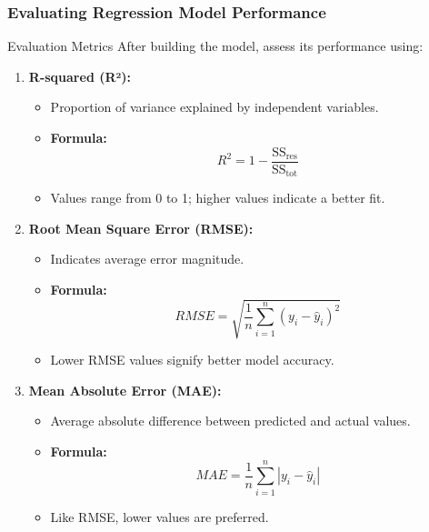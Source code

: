 \documentclass{beamer}
\begin{document}
\begin{frame}
    \frametitle{Evaluating Regression Model Performance}
    \begin{block}{Evaluation Metrics}
        After building the model, assess its performance using:
    \end{block}
    \begin{enumerate}
        \item \textbf{R-squared (R²):}
            \begin{itemize}
                \item Proportion of variance explained by independent variables.
                \item \textbf{Formula:} 
                \[
                R^2 = 1 - \frac{\text{SS}_{\text{res}}}{\text{SS}_{\text{tot}}}
                \]
                \item Values range from 0 to 1; higher values indicate a better fit.
            \end{itemize}
        \item \textbf{Root Mean Square Error (RMSE):}
            \begin{itemize}
                \item Indicates average error magnitude.
                \item \textbf{Formula:} 
                \[
                RMSE = \sqrt{\frac{1}{n}\sum_{i=1}^{n}(y_i - \hat{y}_i)^2}
                \]
                \item Lower RMSE values signify better model accuracy.
            \end{itemize}
        \item \textbf{Mean Absolute Error (MAE):}
            \begin{itemize}
                \item Average absolute difference between predicted and actual values.
                \item \textbf{Formula:} 
                \[
                MAE = \frac{1}{n}\sum_{i=1}^{n}|y_i - \hat{y}_i|
                \]
                \item Like RMSE, lower values are preferred.
            \end{itemize}
    \end{enumerate}
\end{frame}
\end{document}
